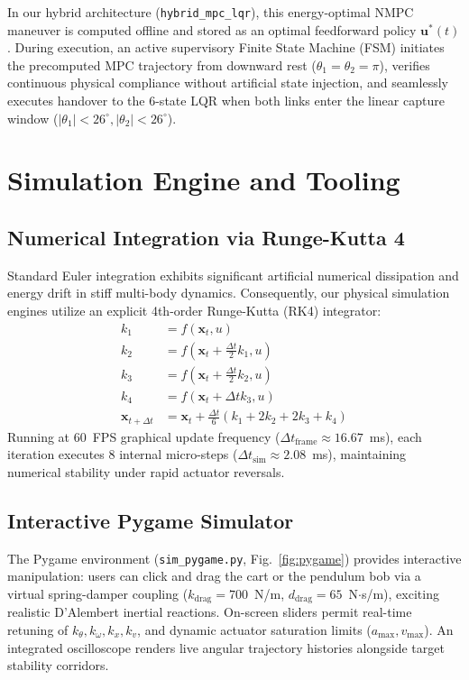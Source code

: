 \documentclass[conference]{IEEEtran}
\begin{document}
In our hybrid architecture (\texttt{hybrid\_mpc\_lqr}), this energy-optimal NMPC maneuver is computed offline and stored as an optimal feedforward policy $\mathbf{u}^*(t)$. During execution, an active supervisory Finite State Machine (FSM) initiates the precomputed MPC trajectory from downward rest ($\theta_1 = \theta_2 = \pi$), verifies continuous physical compliance without artificial state injection, and seamlessly executes handover to the 6-state LQR when both links enter the linear capture window ($|\theta_1| < 26^\circ, |\theta_2| < 26^\circ$).

\section{Simulation Engine and Tooling}

\subsection{Numerical Integration via Runge-Kutta 4}
Standard Euler integration exhibits significant artificial numerical dissipation and energy drift in stiff multi-body dynamics. Consequently, our physical simulation engines utilize an explicit 4th-order Runge-Kutta (RK4) integrator:
\begin{align}
k_1 &= f(\mathbf{x}_t, u) \\
k_2 &= f(\mathbf{x}_t + \tfrac{\Delta t}{2} k_1, u) \\
k_3 &= f(\mathbf{x}_t + \tfrac{\Delta t}{2} k_2, u) \\
k_4 &= f(\mathbf{x}_t + \Delta t k_3, u) \\
\mathbf{x}_{t+\Delta t} &= \mathbf{x}_t + \tfrac{\Delta t}{6}(k_1 + 2k_2 + 2k_3 + k_4)
\end{align}
Running at 60~FPS graphical update frequency ($\Delta t_{\text{frame}} \approx 16.67$~ms), each iteration executes 8 internal micro-steps ($\Delta t_{\text{sim}} \approx 2.08$~ms), maintaining numerical stability under rapid actuator reversals.

\subsection{Interactive Pygame Simulator}
The Pygame environment (\texttt{sim\_pygame.py}, Fig.~\ref{fig:pygame}) provides interactive manipulation: users can click and drag the cart or the pendulum bob via a virtual spring-damper coupling ($k_{\text{drag}} = 700$~N/m, $d_{\text{drag}} = 65$~N$\cdot$s/m), exciting realistic D'Alembert inertial reactions. On-screen sliders permit real-time retuning of $k_\theta, k_\omega, k_x, k_v$, and dynamic actuator saturation limits ($a_{\max}, v_{\max}$). An integrated oscilloscope renders live angular trajectory histories alongside target stability corridors.
\end{document}
